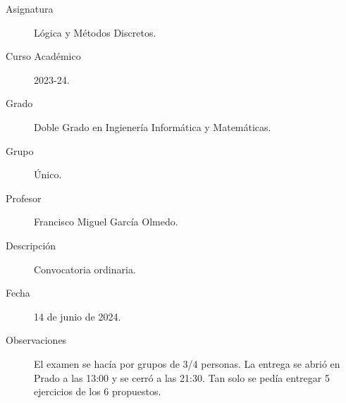 \documentclass[12pt]{article}
\begin{document}

    
    

    \begin{description}
        \item[Asignatura] Lógica y Métodos Discretos.
        \item[Curso Académico] 2023-24.
        \item[Grado] Doble Grado en Ingienería Informática y Matemáticas.
        \item[Grupo] Único.
        \item[Profesor] Francisco Miguel García Olmedo.
        \item[Descripción] Convocatoria ordinaria.
        \item[Fecha] 14 de junio de 2024.
        \item[Observaciones] El examen se hacía por grupos de 3/4 personas. La entrega se abrió en Prado a las 13:00 y se cerró a las 21:30.
        Tan solo se pedía entregar 5 ejercicios de los 6 propuestos.
    
    \end{description}
    \newpage
    
\end{document}
